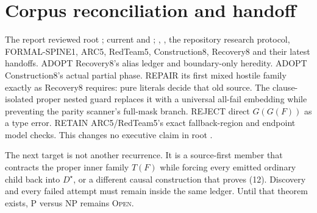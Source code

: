\documentclass[11pt]{article}
\begin{document}
\section{Corpus reconciliation and handoff}
The report reviewed root ; current  and
; , , the repository research
protocol, FORMAL-SPINE1, ARC5, RedTeam5, Construction8, Recovery8 and their
latest handoffs.  ADOPT Recovery8's alias ledger and boundary-only heredity.
ADOPT Construction8's actual partial phase.  REPAIR its first mixed hostile
family exactly as Recovery8 requires: pure literals decide that old source.
The clause-isolated proper nested guard replaces it with a universal all-fail
embedding while preventing the parity scanner's full-mask branch.
REJECT direct $G(G(F))$ as a type error.  RETAIN ARC5/RedTeam5's exact
fallback-region and endpoint model checks.  This changes no executive claim
in root .

The next target is not another recurrence.  It is a source-first member that
contracts the proper inner family $T(F)$ while forcing every emitted
ordinary child back into $D^\star$, or a different causal construction that
proves (12).  Discovery and every failed attempt must remain inside the same
ledger.  Until that theorem exists, P versus NP remains \textsc{Open}.

\end{document}
